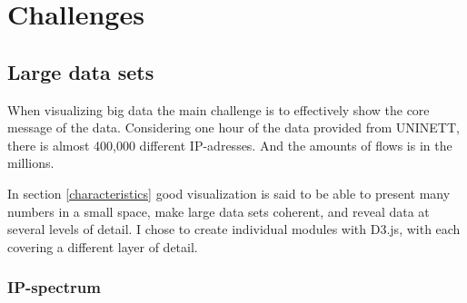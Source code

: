 \chapter{Challenges}
\label{chp:challenges} 
\section{Large data sets}
When visualizing big data the main challenge is to effectively show the core message of the data. Considering one hour of the data provided from UNINETT, there is almost 400,000 different IP-adresses. And the amounts of flows is in the millions. 

In section \ref{characteristics} good visualization is said to be able to present many numbers in a small space,  make large data sets coherent, and reveal data at several levels of detail. I chose to create individual modules with D3.js, with each covering a different layer of detail. 

\subsection{IP-spectrum}

